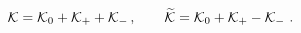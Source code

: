 \begin{equation}
{\cal K} = {\cal K}_0 + {\cal K}_+ +{\cal K}_-\,,\qquad
\widetilde{\cal K} = {\cal K}_0 + {\cal K}_+ -{\cal K}_-~.
\end{equation}

